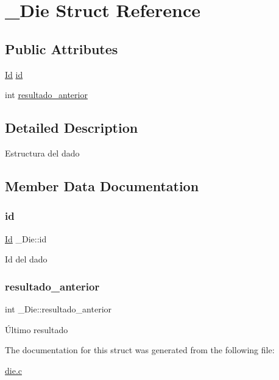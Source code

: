 \hypertarget{struct__Die}{}\section{\+\_\+\+Die Struct Reference}
\label{struct__Die}
\subsection*{Public Attributes}
\begin{DoxyCompactItemize}
\item 
\hyperlink{types_8h_a845e604fb28f7e3d97549da3448149d3}{Id} \hyperlink{struct__Die_a0887af562dda760409957f13619d36f1}{id}
\item 
int \hyperlink{struct__Die_a838ebc47c53074c54c96edf04d40e3cc}{resultado\+\_\+anterior}
\end{DoxyCompactItemize}


\subsection{Detailed Description}
Estructura del dado 

\subsection{Member Data Documentation}
\mbox{\label{struct__Die_a0887af562dda760409957f13619d36f1}} 
\subsubsection{\texorpdfstring{id}{id}}
{\footnotesize\ttfamily \hyperlink{types_8h_a845e604fb28f7e3d97549da3448149d3}{Id} \+\_\+\+Die\+::id}

Id del dado \mbox{\label{struct__Die_a838ebc47c53074c54c96edf04d40e3cc}} 
\subsubsection{\texorpdfstring{resultado\+\_\+anterior}{resultado\_anterior}}
{\footnotesize\ttfamily int \+\_\+\+Die\+::resultado\+\_\+anterior}

Último resultado 

The documentation for this struct was generated from the following file\+:\begin{DoxyCompactItemize}
\item 
\hyperlink{die_8c}{die.\+c}\end{DoxyCompactItemize}
